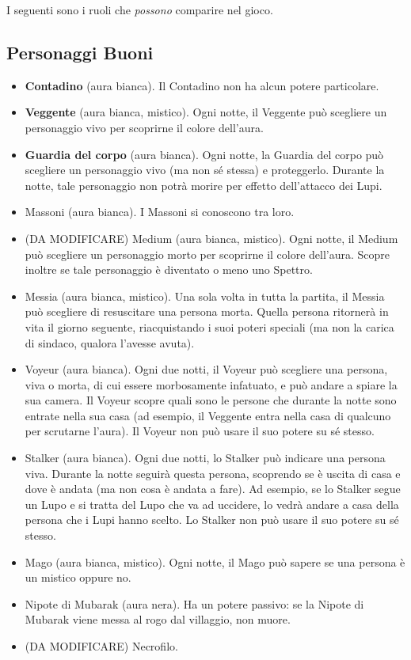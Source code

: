 \documentclass[a4paper,10pt]{article}
\begin{document}
I seguenti sono i ruoli che \emph{possono} comparire nel gioco.


\subsection*{Personaggi Buoni}

\begin{itemize}
 \item {\bf Contadino} (aura bianca). Il Contadino non ha alcun potere particolare.
 
 \item {\bf Veggente} (aura bianca, mistico). Ogni notte, il Veggente può scegliere un personaggio vivo per scoprirne il colore dell'aura.

 \item {\bf Guardia del corpo} (aura bianca). Ogni notte, la Guardia del corpo può scegliere un personaggio vivo (ma non sé stessa) e proteggerlo. Durante la notte, tale personaggio non potrà morire per effetto dell'attacco dei Lupi.
 
 \item Massoni (aura bianca). I Massoni si conoscono tra loro.
 
 \item (DA MODIFICARE) Medium (aura bianca, mistico). Ogni notte, il Medium può scegliere un personaggio morto per scoprirne il colore dell'aura. Scopre inoltre se tale personaggio è diventato o meno uno Spettro.

 \item Messia (aura bianca, mistico). Una sola volta in tutta la partita, il Messia può scegliere di resuscitare una persona morta. Quella persona ritornerà in vita il giorno seguente, riacquistando i suoi poteri speciali (ma non la carica di sindaco, qualora l'avesse avuta).

 \item Voyeur (aura bianca). Ogni due notti, il Voyeur può scegliere una persona, viva o morta, di cui essere morbosamente infatuato, e può andare a spiare la sua camera. Il Voyeur scopre quali sono le persone che durante la notte sono entrate nella sua casa (ad esempio, il Veggente entra nella casa di qualcuno per scrutarne l'aura).
 Il Voyeur non può usare il suo potere su sé stesso.

 \item Stalker (aura bianca). Ogni due notti, lo Stalker può indicare una persona viva. Durante la notte seguirà questa persona, scoprendo se è uscita di casa e dove è andata (ma non cosa è andata a fare).
 Ad esempio, se lo Stalker segue un Lupo e si tratta del Lupo che va ad uccidere, lo vedrà andare a casa della persona che i Lupi hanno scelto.
 Lo Stalker non può usare il suo potere su sé stesso.
 
 \item Mago (aura bianca, mistico). Ogni notte, il Mago può sapere se una persona è un mistico oppure no.
 
 \item Nipote di Mubarak (aura nera). Ha un potere passivo: se la Nipote di Mubarak viene messa al rogo dal villaggio, non muore.

 \item (DA MODIFICARE) Necrofilo.
 
 
\end{itemize}
\end{document}
